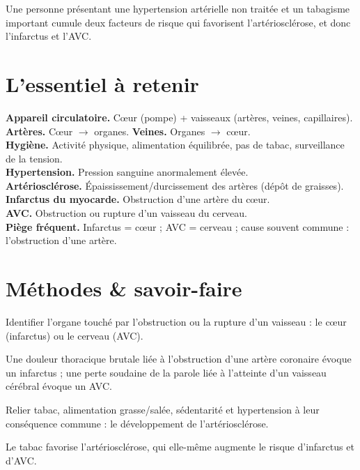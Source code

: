 \begin{exemple}
Une personne présentant une hypertension artérielle non traitée et un tabagisme
important cumule deux facteurs de risque qui favorisent l'artériosclérose, et donc
l'infarctus et l'AVC.
\end{exemple}

\section{L'essentiel à retenir}

\begin{synthese}
\textbf{Appareil circulatoire.} Cœur (pompe) + vaisseaux (artères, veines,
capillaires).\\[4pt]
\textbf{Artères.} Cœur $\to$ organes. \textbf{Veines.} Organes $\to$ cœur.\\[4pt]
\textbf{Hygiène.} Activité physique, alimentation équilibrée, pas de tabac,
surveillance de la tension.\\[4pt]
\textbf{Hypertension.} Pression sanguine anormalement élevée.\\[4pt]
\textbf{Artériosclérose.} Épaississement/durcissement des artères (dépôt de
graisses).\\[4pt]
\textbf{Infarctus du myocarde.} Obstruction d'une artère du cœur.\\[4pt]
\textbf{AVC.} Obstruction ou rupture d'un vaisseau du cerveau.\\[4pt]
\textbf{Piège fréquent.} Infarctus = cœur ; AVC = cerveau ; cause souvent commune :
l'obstruction d'une artère.
\end{synthese}

\section{Méthodes \& savoir-faire}

Identifier l'organe touché par l'obstruction ou la rupture d'un vaisseau : le cœur
(infarctus) ou le cerveau (AVC).
\begin{exemple}
Une douleur thoracique brutale liée à l'obstruction d'une artère coronaire évoque un
infarctus ; une perte soudaine de la parole liée à l'atteinte d'un vaisseau cérébral
évoque un AVC.
\end{exemple}

Relier tabac, alimentation grasse/salée, sédentarité et hypertension à leur
conséquence commune : le développement de l'artériosclérose.
\begin{exemple}
Le tabac favorise l'artériosclérose, qui elle-même augmente le risque d'infarctus et
d'AVC.
\end{exemple}

